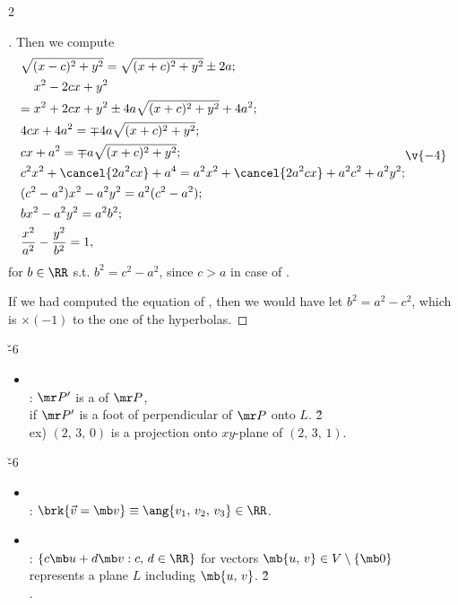 \documentclass[dvipdfmx,a4paper,titlepage,9pt]{jsarticle}
\begin{document}
\begin{multicols*}{2}
\begin{itemize}
\begin{pfbox}
\begin{proof}[]
Then we compute
$$\begin{aligned}
   & \sqrt{(x-c)^2+y^2}=\sqrt{(x+c)^2+y^2}\pm 2a; \\
   & \begin{aligned}
      &x^2-2cx+y^2 \\
     ={}&x^2+2cx+y^2\pm4a\sqrt{(x+c)^2+y^2}+4a^2;
     \end{aligned} \\
   & 4cx+4a^2=\mp4a\sqrt{(x+c)^2+y^2}; \\
   & cx+a^2=\mp a\sqrt{(x+c)^2+y^2}; \\
   & c^2x^2+\cancel{2a^2cx}+a^4=a^2x^2+\cancel{2a^2cx}+a^2c^2+a^2y^2; \\
   & (c^2-a^2)x^2-a^2y^2=a^2(c^2-a^2); \\
   & bx^2-a^2y^2=a^2b^2; \\
   & \frac{x^2}{a^2}-\frac{y^2}{b^2}=1,
  \end{aligned}\v{-4}$$
for $b\in\RR$ s.t. $b^2=c^2-a^2$, since $c>a$ in case of .

If we had computed the equation of , then we would have let $b^2=a^2-c^2$, which is $\times(-1)$ to the one of the hyperbolas.
\end{proof}
\end{pfbox}
\end{itemize}

\vfill\null\columnbreak


 \v{-6}
\begin{itemize}[label={-}]
\item{} \\
: $\mr P'$ is a  of $\mr P$,\\
\;\;if $\mr P'$ is a foot of perpendicular of $\mr P$ onto $L$. \v2 \\
\;\;ex) $(2,\,3,\,0)$ is a projection onto $xy$-plane of $(2,\,3,\,1)$. \\
\end{itemize}

 \v{-6}
\begin{itemize}[label={-}]
\item{} \\
: $\brk{\vec{v}=\mb v}\equiv\ang{v_1,\,v_2,\,v_3}\in\RR$. \\

\item{} \\
: $\{c\mb u+d\mb v:c,\,d\in\RR\}$ for vectors $\mb{u,\,v}\in V\setminus\{\mb0\}$ \\
\;\;represents a plane $L$ including $\mb{u,\,v}$. \v2 \\
\;\;. \\


\end{itemize}
\end{multicols*}
\end{document}

